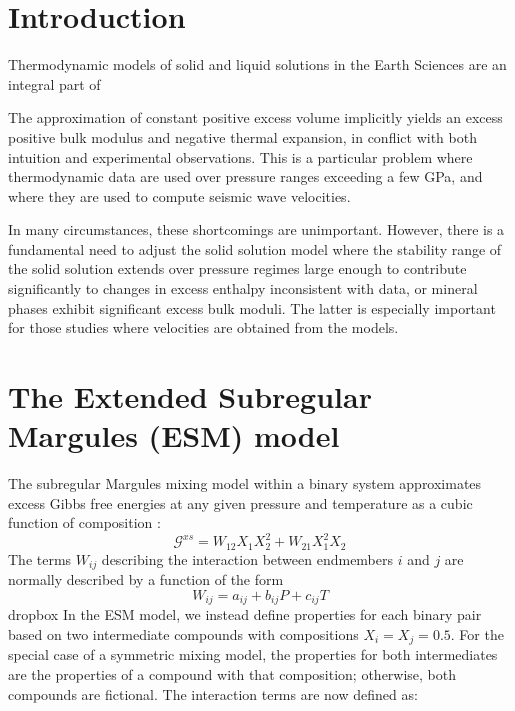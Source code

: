 \documentclass[review]{elsarticle}
\begin{document}
\linenumbers

\section{Introduction}

Thermodynamic models of solid and liquid solutions in the Earth Sciences are an integral part of 


  The approximation of constant positive excess volume implicitly yields an excess positive bulk modulus and negative thermal expansion, in conflict with both intuition and experimental observations. This is a particular problem where thermodynamic data are used over pressure ranges exceeding a few GPa, and where they are used to compute seismic wave velocities. 

In many circumstances, these shortcomings are unimportant. However, there is a fundamental need to adjust the solid solution model where the stability range of the solid solution extends over pressure regimes large enough to contribute significantly to changes in excess enthalpy inconsistent with data, or mineral phases exhibit significant excess bulk moduli. The latter is especially important for those studies where velocities are obtained from the models.



\section{The Extended Subregular Margules (ESM) model}
The subregular Margules mixing model within a binary system approximates excess Gibbs free energies at any given pressure and temperature as a cubic function of composition \citep{HW1989}:
\begin{equation}
  \mathcal{G}^{xs} = W_{12} X_1X_2^2 + W_{21} X_1^2X_2 
\end{equation}
The terms $W_{ij}$ describing the interaction between endmembers $i$ and $j$ are normally described by a function of the form
\begin{equation}
  W_{ij} = a_{ij} + b_{ij}P + c_{ij}T
\end{equation}
dropbox
In the ESM model, we instead define properties for each binary pair based on two intermediate compounds with compositions $X_i = X_j = 0.5$. For the special case of a symmetric mixing model, the properties for both intermediates are the properties of a compound with that composition; otherwise, both compounds are fictional. The interaction terms are now defined as:
\end{document}
